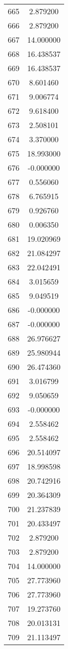 \documentclass[12pt]{article}
\begin{document}
\begin{longtable}{@{}cc@{}}
665 & 2.879200 \\
666 & 2.879200 \\
667 & 14.000000 \\
668 & 16.438537 \\
669 & 16.438537 \\
670 & 8.601460 \\
671 & 9.006774 \\
672 & 9.618400 \\
673 & 2.508101 \\
674 & 3.370000 \\
675 & 18.993000 \\
676 & -0.000000 \\
677 & 0.556060 \\
678 & 6.765915 \\
679 & 0.926760 \\
680 & 0.006350 \\
681 & 19.020969 \\
682 & 21.084297 \\
683 & 22.042491 \\
684 & 3.015659 \\
685 & 9.049519 \\
686 & -0.000000 \\
687 & -0.000000 \\
688 & 26.976627 \\
689 & 25.980944 \\
690 & 26.474360 \\
691 & 3.016799 \\
692 & 9.050659 \\
693 & -0.000000 \\
694 & 2.558462 \\
695 & 2.558462 \\
696 & 20.514097 \\
697 & 18.998598 \\
698 & 20.742916 \\
699 & 20.364309 \\
700 & 21.237839 \\
701 & 20.433497 \\
702 & 2.879200 \\
703 & 2.879200 \\
704 & 14.000000 \\
705 & 27.773960 \\
706 & 27.773960 \\
707 & 19.273760 \\
708 & 20.013131 \\
709 & 21.113497 \\

\end{longtable}
\end{document}
